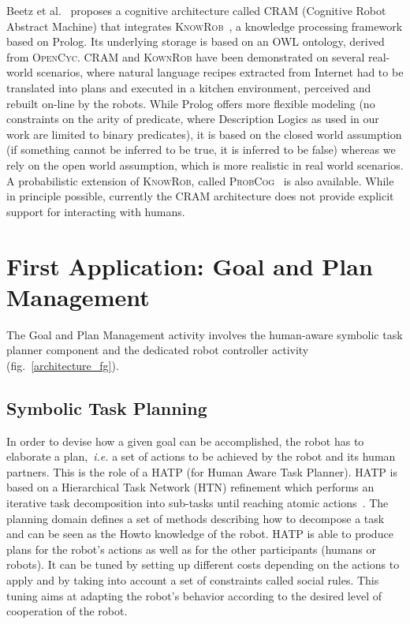 \documentclass{svmult}
\begin{document}
Beetz et al.~\cite{Beetz2010} proposes a cognitive architecture called
\textsc{CRAM} (Cognitive Robot Abstract Machine) that integrates
\textsc{KnowRob}~\cite{Tenorth2009a}, a knowledge processing framework based on
Prolog. Its underlying storage is based on an OWL ontology, derived from
\textsc{OpenCyc}. \textsc{CRAM} and \textsc{KownRob} have been demonstrated on
several real-world scenarios, where natural language recipes extracted from
Internet had to be translated into plans and executed in a kitchen environment,
perceived and rebuilt on-line by the robots. While Prolog offers more flexible
modeling (no constraints on the arity of predicate, where Description Logics as
used in our work are limited to binary predicates), it is based on the closed
world assumption (if something cannot be inferred to be true, it is inferred to
be false) whereas we rely on the open world assumption, which is more realistic
in real world scenarios. A probabilistic extension of \textsc{KnowRob}, called
\textsc{ProbCog}~\cite{Jain2009} is also available. While in principle
possible, currently the CRAM architecture does not provide explicit support for
interacting with humans.


\section{First Application: Goal and Plan Management}
\label{sec|hatp}


The Goal and Plan Management activity involves the human-aware
symbolic task planner component and the dedicated robot controller
activity (fig.~\ref{architecture_fg}).

\subsection{Symbolic Task Planning}

In order to devise how a given goal can be accomplished, the robot has
to elaborate a plan,~\textit{i.e.} a set of actions to be achieved by
the robot and its human partners.  This is the role of a HATP
\cite{Alili2008} (for Human Aware Task Planner).  HATP is based on a
Hierarchical Task Network (HTN) refinement which performs an iterative
task decomposition into sub-tasks until reaching atomic
actions~\cite{Nau2003}.  The planning domain defines a set of methods
describing how to decompose a task and can be seen as the Howto
knowledge of the robot.  HATP is able to produce plans for the robot's
actions as well as for the other participants (humans or robots). It
can be tuned by setting up different costs depending on the actions to
apply and by taking into account a set of constraints called social
rules. This tuning aims at adapting the robot's behavior according to
the desired level of cooperation of the robot.
\end{document}
